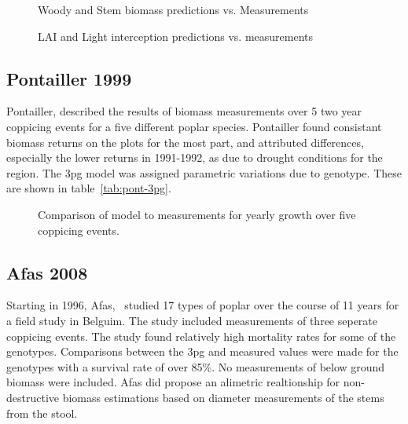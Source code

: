 \documentclass[10pt]{article}
\begin{document}
\begin{figure}
  \centering
  
  \caption{Woody and Stem biomass predictions vs. Measurements}
  \label{fig:proe-wood}
\end{figure}

\begin{figure}[!ht]
  \centering
  
  \caption{LAI and Light interception predictions vs. measurements}
  \label{fig:proe-light}
\end{figure}

\subsection{Pontailler 1999}
\label{sec:pont}

Pontailler, \cite{pontailler99biomass-yield} described the results of
biomass measurements over 5 two year coppicing events for a five
different poplar species.  Pontailler found consistant biomass returns
on the plots for the most part, and attributed differences, especially
the lower returns in 1991-1992, as due to drought conditions for the
region.  The \ac{3pg} model was assigned parametric variations due to
genotype.  These are shown in table~\ref{tab:pont-3pg}.

\begin{table}[!ht]
  \centering
  \caption{\ac{3pg} parameter variations of \ac{3pg} among genotypes}
  \label{tab:pont-3pg}
\end{table}

\begin{figure}[!ht]
  \centering

  \caption{Comparison of model to measurements for yearly growth over five
    coppicing events.}
\label{fig:pont-biomass}
\end{figure}


\subsection{Afas 2008}
\label{Afas2008}

Starting in 1996, Afas,~\cite{Afas2008a} studied 17 types of poplar
over the course of 11 years for a field study in Belguim.  The study
included measurements of three seperate coppicing events.  The study
found relatively high mortality rates for some of the genotypes.
Comparisons between the \ac{3pg} and measured values were made for the
genotypes with a survival rate of over 85\%.  No measurements of below
ground biomass were included.  Afas did propose an alimetric
realtionship for non-destructive biomass estimations based on diameter
measurements of the stems from the stool.
\end{document}
